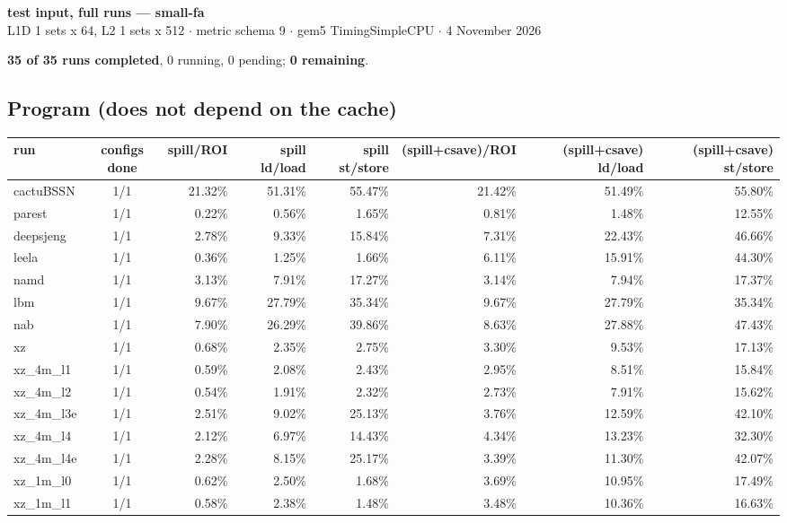 \documentclass[10pt,a4paper,landscape]{article}
\begin{document}
\begin{center}
{\large\bfseries test input, full runs --- small-fa}\\[3pt]
{\small L1D 1 sets x 64, L2 1 sets x 512 $\cdot$ metric schema 9 $\cdot$ gem5 TimingSimpleCPU $\cdot$ 4 November 2026}
\end{center}
\textbf{35 of 35 runs completed}, 0 running, 0 pending; \textbf{0 remaining}.\par
\subsection*{Program (does not depend on the cache)}
{\footnotesize
\begin{longtable}{lcrrrrrr}
\toprule
run & configs done & spill/ROI & spill ld/load & spill st/store & (spill+csave)/ROI & (spill+csave) ld/load & (spill+csave) st/store \\
\midrule
\endhead
\bottomrule
\endfoot
cactuBSSN & 1/1 & 21.32\% & 51.31\% & 55.47\% & 21.42\% & 51.49\% & 55.80\% \\
parest & 1/1 & 0.22\% & 0.56\% & 1.65\% & 0.81\% & 1.48\% & 12.55\% \\
deepsjeng & 1/1 & 2.78\% & 9.33\% & 15.84\% & 7.31\% & 22.43\% & 46.66\% \\
leela & 1/1 & 0.36\% & 1.25\% & 1.66\% & 6.11\% & 15.91\% & 44.30\% \\
namd & 1/1 & 3.13\% & 7.91\% & 17.27\% & 3.14\% & 7.94\% & 17.37\% \\
lbm & 1/1 & 9.67\% & 27.79\% & 35.34\% & 9.67\% & 27.79\% & 35.34\% \\
nab & 1/1 & 7.90\% & 26.29\% & 39.86\% & 8.63\% & 27.88\% & 47.43\% \\
xz & 1/1 & 0.68\% & 2.35\% & 2.75\% & 3.30\% & 9.53\% & 17.13\% \\
xz\_4m\_l1 & 1/1 & 0.59\% & 2.08\% & 2.43\% & 2.95\% & 8.51\% & 15.84\% \\
xz\_4m\_l2 & 1/1 & 0.54\% & 1.91\% & 2.32\% & 2.73\% & 7.91\% & 15.62\% \\
xz\_4m\_l3e & 1/1 & 2.51\% & 9.02\% & 25.13\% & 3.76\% & 12.59\% & 42.10\% \\
xz\_4m\_l4 & 1/1 & 2.12\% & 6.97\% & 14.43\% & 4.34\% & 13.23\% & 32.30\% \\
xz\_4m\_l4e & 1/1 & 2.28\% & 8.15\% & 25.17\% & 3.39\% & 11.30\% & 42.07\% \\
xz\_1m\_l0 & 1/1 & 0.62\% & 2.50\% & 1.68\% & 3.69\% & 10.95\% & 17.49\% \\
xz\_1m\_l1 & 1/1 & 0.58\% & 2.38\% & 1.48\% & 3.48\% & 10.36\% & 16.63\% \\

\end{longtable}}
\end{document}
